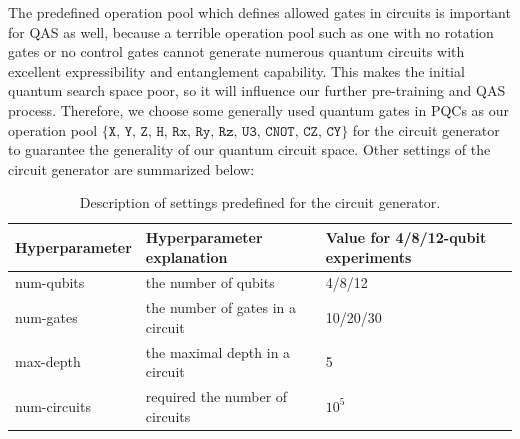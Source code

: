 \documentclass{article} %
\begin{document}
The predefined operation pool which defines allowed gates in circuits is important for QAS as well, because a terrible operation pool such as one with no rotation gates or no control gates cannot generate numerous quantum circuits with excellent expressibility and entanglement capability. This makes the initial quantum search space poor, so it will influence our further pre-training and QAS process. Therefore, we choose some generally used quantum gates in PQCs as our operation pool $\{\texttt{X, Y, Z, H, Rx, Ry, Rz, U3, CNOT, CZ, CY}\}$ for the circuit generator to guarantee the generality of our quantum circuit space. Other settings of the circuit generator are summarized below:
\begin{table}[ht]
\centering
     \caption{Description of settings predefined for the circuit generator.}
    \begin{tabular}{p{}p{}p{}}
    \hline
     Hyperparameter & Hyperparameter explanation & Value for 4/8/12-qubit experiments\\
    \hline
    num-qubits & the number of qubits & 4/8/12\\
    num-gates & the number of gates in a circuit & 10/20/30\\
    max-depth & the maximal depth in a circuit & 5\\
    num-circuits & required the number of circuits & $10^5$\\
    \bottomrule
  \end{tabular}
\label{generator_setting}
\end{table}
\end{document}
